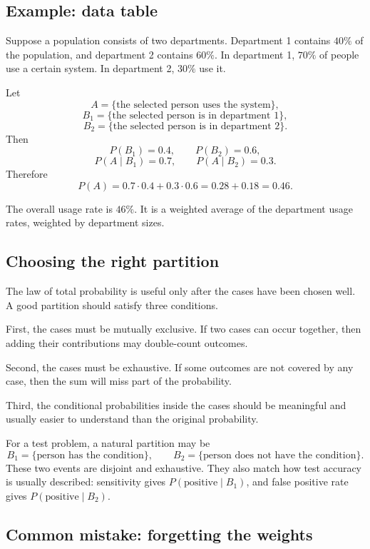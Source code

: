 \subsection*{Example: data table}

Suppose a population consists of two departments. Department 1 contains \(40\%\)
of the population, and department 2 contains \(60\%\). In department 1, \(70\%\)
of people use a certain system. In department 2, \(30\%\) use it.

Let
\[
A=\{\text{the selected person uses the system}\},
\]
\[
B_1=\{\text{the selected person is in department 1}\},
\]
\[
B_2=\{\text{the selected person is in department 2}\}.
\]
Then
\[
P(B_1)=0.4,\qquad P(B_2)=0.6,
\]
\[
P(A\mid B_1)=0.7,\qquad P(A\mid B_2)=0.3.
\]
Therefore
\[
P(A)=0.7\cdot0.4+0.3\cdot0.6=0.28+0.18=0.46.
\]

The overall usage rate is \(46\%\). It is a weighted average of the department
usage rates, weighted by department sizes.

\subsection*{Choosing the right partition}

The law of total probability is useful only after the cases have been chosen
well. A good partition should satisfy three conditions.

First, the cases must be mutually exclusive. If two cases can occur together,
then adding their contributions may double-count outcomes.

Second, the cases must be exhaustive. If some outcomes are not covered by any
case, then the sum will miss part of the probability.

Third, the conditional probabilities inside the cases should be meaningful and
usually easier to understand than the original probability.

\begin{examplebox}
For a test problem, a natural partition may be
\[
B_1=\{\text{person has the condition}\},\qquad
B_2=\{\text{person does not have the condition}\}.
\]
These two events are disjoint and exhaustive. They also match how test accuracy
is usually described: sensitivity gives \(P(\text{positive}\mid B_1)\), and
false positive rate gives \(P(\text{positive}\mid B_2)\).
\end{examplebox}

\subsection*{Common mistake: forgetting the weights}

